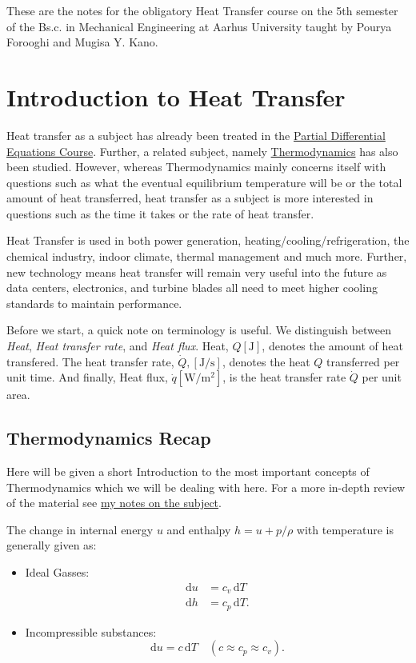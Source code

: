 
These are the notes for the obligatory Heat Transfer course on the 5th semester of the Bs.c. in Mechanical Engineering at Aarhus University taught by Pourya Forooghi and Mugisa Y. Kano.

\section{Introduction to Heat Transfer}
Heat transfer as a subject has already been treated in the \href{https://www.bigum.dev/notes/partial-differential-equations.pdf}{Partial Differential Equations Course}.
Further, a related subject, namely \href{https://www.bigum.dev/notes/thermodynamics.pdf}{Thermodynamics} has also been studied.
However, whereas Thermodynamics mainly concerns itself with questions such as what the eventual equilibrium temperature will be or the total amount of heat transferred, heat transfer as a subject is more interested in questions such as the time it takes or the rate of heat transfer.

Heat Transfer is used in both power generation, heating/cooling/refrigeration, the chemical industry, indoor climate, thermal management and much more.
Further, new technology means heat transfer will remain very useful into the future as data centers, electronics, and turbine blades all need to meet higher cooling standards to maintain performance. 

Before we start, a quick note on terminology is useful.
We distinguish between \textit{Heat}, \textit{Heat transfer rate}, and \textit{Heat flux}.
Heat, $Q [\unit{\J}]$, denotes the amount of heat transfered.
The heat transfer rate, $\dot{Q}, [\unit{\J\per\s}]$, denotes the heat $Q$ transferred per unit time.
And finally, Heat flux, $\dot{q} [\unit{\W\per\m\squared}]$, is the heat transfer rate $\dot{Q}$ per unit area.

\subsection{Thermodynamics Recap}
Here will be given a short Introduction to the most important concepts of Thermodynamics which we will be dealing with here.
For a more in-depth review of the material see \href{https://www.bigum.dev/notes/thermodynamics.pdf}{my notes on the subject}.

The change in internal energy $u$ and enthalpy $h=u+p / \rho$ with temperature is generally given as:
\begin{itemize}
  \item Ideal Gasses:
    \begin{align*}
      \mathrm{d}u &= c_v \, \mathrm{d}T \\
      \mathrm{d}h &= c_p \, \mathrm{d}T
    .\end{align*}
  \item Incompressible substances:
    \begin{equation*}
      \mathrm{d}u = c \, \mathrm{d}T \quad (c \approx c_p \approx c_v)
    .\end{equation*}
\end{itemize}

